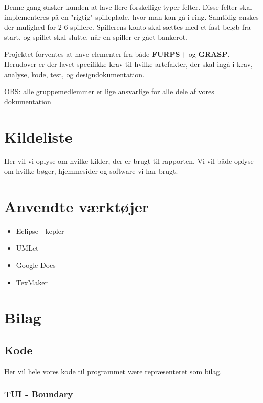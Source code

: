 \documentclass{article}
\begin{document}
Denne gang ønsker kunden at lave flere forskellige typer felter. Disse felter skal implementeres på en "rigtig" spilleplade, hvor man kan gå i ring. Samtidig ønskes der mulighed for 2-6 spillere. Spillerens konto skal sættes med et fast beløb fra start, og spillet skal slutte, når en spiller er gået bankerot.


Projektet forventes at have elementer fra både \textbf{FURPS+} og \textbf{GRASP}. Herudover er der lavet specifikke krav til hvilke artefakter, der skal ingå i krav, analyse, kode, test, og designdokumentation.



OBS: alle gruppemedlemmer er lige ansvarlige for alle dele af vores dokumentation










\section{Kildeliste}
Her vil vi oplyse om hvilke kilder, der er brugt til rapporten.
Vi vil både oplyse om hvilke bøger, hjemmesider og software vi har brugt.
\printbibliography %
\section{Anvendte værktøjer}
\begin{itemize}
\item Eclipse - kepler
\item UMLet
\item Google Docs
\item TexMaker
\end{itemize}
\newpage
\section{Bilag}
\subsection{Kode}
Her vil hele vores kode til programmet være repræsenteret som bilag.
\subsubsection{TUI - Boundary}

\end{document}
